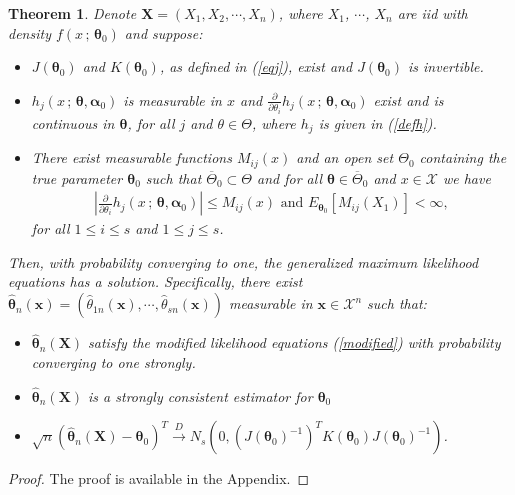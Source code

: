 \documentclass[12pt]{article} %
\newcommand{\bs}{\boldsymbol}
\newtheorem{theorem}{Theorem}
\theoremstyle{definition}
\begin{document}
\begin{theorem}\label{coprinc} Denote $\bs{X}=\left(X_1, X_2, \cdots, X_n\right)$, where $X_1$, $\cdots$, $X_n$ are iid with density $f(x\,;\,\bs{\theta}_0)$ and suppose:
\begin{itemize}

\item[(A)]  $J(\bs{\theta}_0)$ and $K(\bs{\theta}_0)$, as defined in (\ref{eqj}), exist and $J(\bs{\theta}_0)$ is invertible.
\item[(B)] $h_j(x\, ;\, \bs{\theta},\bs{\alpha}_0)$ is measurable in $x$ and $\frac{\partial}{\partial \theta_i}h_j(x\, ;\, \bs{\theta},\bs{\alpha}_0)$ exist and is continuous in $\bs{\theta}$, for all $j$ and $\theta\in \Theta$, where $h_j$ is given in (\ref{defh}).
\item[(C)] There exist measurable functions $M_{ij}(x)$ and an open set $\Theta_0$ containing the true parameter $\bs{\theta}_0$ such that $\overline{\Theta}_0\subset \Theta$ and for all $\bs{\theta}\in \overline{\Theta}_0$ and $x\in \mathcal{X}$ we have
\begin{equation*}
 \begin{aligned}
 \left|\frac{\partial}{\partial\theta_i} h_j(x\, ;\, \bs{\theta},\bs{\alpha}_0)\right|\leq M_{ij}(x)\mbox{ and }E_{\bs{\theta}_0}\left[M_{ij}(X_1)\right]<\infty,
 \end{aligned}
 \end{equation*}
for all $1\leq i\leq s$ and $1\leq j\leq s$.
\end{itemize}
Then, with probability converging to one, the generalized maximum likelihood equations has a solution. Specifically, there exist  $\bs{\hat{\theta}}_n(\bs{x})=(\hat{\theta}_{1n}(\bs{x}),\cdots,\hat{\theta}_{sn}(\bs{x}))$ measurable in $\bs{x}\in \mathcal{X}^n$ such that:
\begin{itemize}
\item[I)] $\bs{\hat{\theta}}_n(\bs{X})$ satisfy the modified likelihood equations (\ref{modified}) with probability converging to one strongly.
\item[II)] $\bs{\hat{\theta}}_n(\bs{X})$ is a strongly consistent estimator for $\bs{\theta}_0$
\item[III)]
$\sqrt{n}(\bs{\hat{\theta}}_n(\bs{X})-\bs{\theta}_0)^T\overset{D}{\to} N_s\left(0,(J(\bs{\theta}_0)^{-1})^T K(\bs{\theta}_0)J(\bs{\theta}_0)^{-1}\right)$.
\end{itemize}
\end{theorem}

\begin{proof} The proof is available in the Appendix.
 \end{proof}
\end{document}
